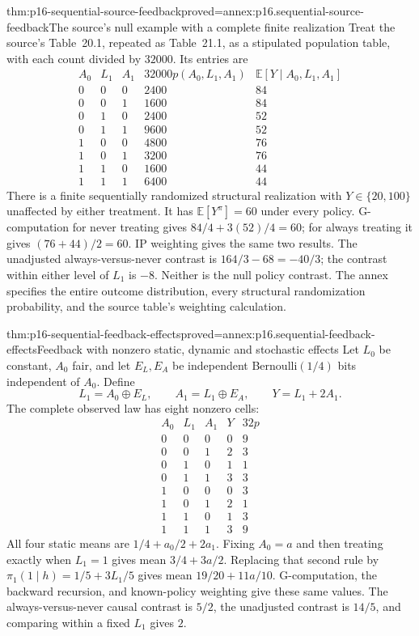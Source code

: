 \begin{hbtheorem}{thm:p16-sequential-source-feedback}{proved=annex:p16.sequential-source-feedback}{The source's null example with a complete finite realization}
Treat the source's Table~20.1, repeated as Table~21.1, as a stipulated
population table, with each count divided by \(32000\). Its entries are
\[
\begin{array}{ccc|r|r}
 A_0&L_1&A_1&32000p(A_0,L_1,A_1)&\mathbb E[Y\mid A_0,L_1,A_1]\\\hline
 0&0&0&2400&84\\0&0&1&1600&84\\
 0&1&0&2400&52\\0&1&1&9600&52\\
 1&0&0&4800&76\\1&0&1&3200&76\\
 1&1&0&1600&44\\1&1&1&6400&44
\end{array}
\]
There is a finite sequentially randomized structural realization with
\(Y\in\{20,100\}\) unaffected by either treatment. It has
\(\mathbb E[Y^\pi]=60\) under every policy.
G-computation for never treating gives \(84/4+3(52)/4=60\);
for always treating it gives \((76+44)/2=60\). IP weighting gives
the same two results. The unadjusted always-versus-never contrast is
\(164/3-68=-40/3\); the contrast within either level of \(L_1\)
is \(-8\). Neither is the null policy contrast.
The annex specifies the entire outcome distribution, every structural
randomization probability, and the source table's weighting calculation.
\end{hbtheorem}

\begin{hbtheorem}{thm:p16-sequential-feedback-effects}{proved=annex:p16.sequential-feedback-effects}{Feedback with nonzero static, dynamic and stochastic effects}
Let \(L_0\) be constant, \(A_0\) fair, and let \(E_L,E_A\) be
independent Bernoulli\((1/4)\) bits independent of \(A_0\). Define
\[
 L_1=A_0\mathbin\oplus E_L,\qquad
 A_1=L_1\mathbin\oplus E_A,\qquad Y=L_1+2A_1.
\]
The complete observed law has eight nonzero cells:
\[
\begin{array}{ccc|c|c}
 A_0&L_1&A_1&Y&32p\\\hline
 0&0&0&0&9\\0&0&1&2&3\\0&1&0&1&1\\0&1&1&3&3\\
 1&0&0&0&3\\1&0&1&2&1\\1&1&0&1&3\\1&1&1&3&9
\end{array}
\]
All four static means are \(1/4+a_0/2+2a_1\). Fixing \(A_0=a\)
and then treating exactly when \(L_1=1\) gives mean
\(3/4+3a/2\). Replacing that second rule by
\(\pi_1(1\mid h)=1/5+3L_1/5\) gives mean
\(19/20+11a/10\). G-computation, the backward recursion, and known-policy
weighting give these same values. The always-versus-never causal contrast
is \(5/2\), the unadjusted contrast is \(14/5\), and comparing within a
fixed \(L_1\) gives \(2\).
\end{hbtheorem}

